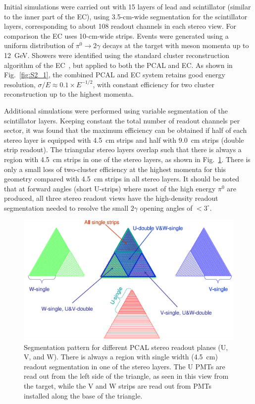 Initial simulations were carried out with 15 layers of lead and scintillator (similar to the inner part of the EC),
using 3.5-cm-wide segmentation for the scintillator layers, corresponding to about 108 readout channels in each
stereo view. For comparison the EC uses 10-cm-wide strips. Events were generated using a uniform distribution
of $\pi^0 \to 2\gamma$ decays at the target with meson momenta up to 12~GeV. Showers were identified using
the standard cluster reconstruction algorithm of the EC~\cite{nim:recon}, but applied to both the PCAL and EC.
As shown in Fig.~\ref{fig:S2_1}, the combined PCAL and EC system retains good energy resolution,
$\sigma/E \approx 0.1 \times E^{-1/2}$, with constant efficiency for two cluster reconstruction up to the highest
momenta.

Additional simulations were performed using variable segmentation of the scintillator layers. Keeping constant
the total number of readout channels per sector, it was found that the maximum efficiency can be obtained if half
of each stereo layer is equipped with 4.5~cm strips and half with 9.0~cm strips (double strip readout). The triangular
stereo layers overlap such that there is always a region with 4.5~cm strips in one of the stereo layers, as shown in
Fig.~\ref{fig:S2_2}. There is only a small loss of two-cluster efficiency at the highest momenta for this geometry
compared with 4.5~cm strips in all stereo layers. It should be noted that at forward angles (short U-strips) where
most of the high energy $\pi^0$ are produced, all three stereo readout views have the high-density readout
segmentation needed to resolve the small $2\gamma$ opening angles of $<3^\circ$.

\begin{figure}[hbt]
\centering
\includegraphics[width=0.95\columnwidth,keepaspectratio]{img/S2_2.png}
\caption{Segmentation pattern for different PCAL stereo readout planes (U, V, and W). There is always a region
  with single width (4.5~cm) readout segmentation in one of the stereo layers. The U PMTs are read out from the
  left side of the triangle, as seen in this view from the target, while the V and W strips are read out from PMTs
  installed along the base of the triangle.}
\label{fig:S2_2}
\end{figure}



